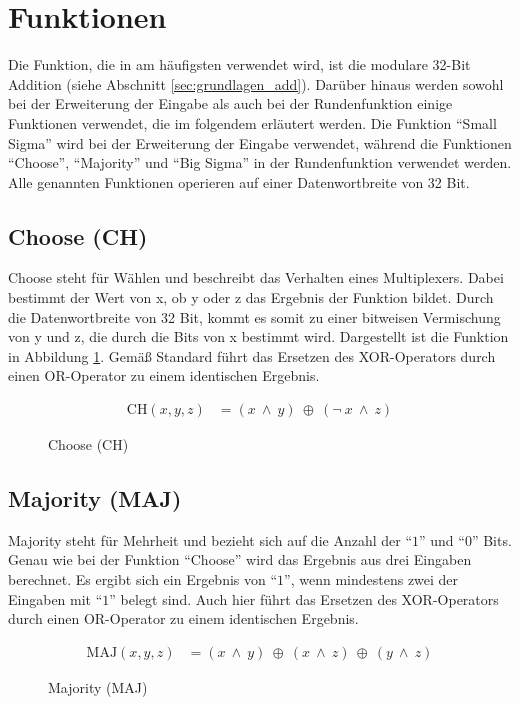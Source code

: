 \section{Funktionen}
\label{sec:sha256:funktionen}

Die Funktion, die in  am häufigsten verwendet wird, ist die modulare 32-Bit Addition (siehe Abschnitt \ref{sec:grundlagen_add}).
Darüber hinaus werden sowohl bei der Erweiterung der Eingabe als auch bei der Rundenfunktion einige Funktionen verwendet, die im folgendem erläutert werden.
Die Funktion "`Small Sigma"' wird bei der Erweiterung der Eingabe verwendet, während die Funktionen "`Choose"', "`Majority"' und "`Big Sigma"' in der Rundenfunktion
verwendet werden. Alle genannten Funktionen operieren auf einer Datenwortbreite von 32 Bit.


\subsection{Choose (CH)}
Choose steht für Wählen und beschreibt das Verhalten eines Multiplexers. Dabei bestimmt der Wert von x, ob y oder z das Ergebnis der Funktion bildet.
Durch die Datenwortbreite von 32 Bit, kommt es somit zu einer bitweisen Vermischung von y und z, die durch die Bits von x bestimmt wird. Dargestellt
ist die Funktion in Abbildung \ref{eq:ch}. Gemäß Standard \cite[10]{nist1804} führt das Ersetzen des XOR-Operators durch einen OR-Operator zu einem identischen Ergebnis.
\begin{figure}[!h]
  \begin{align}
  \text{CH}( x, y, z) &= (x~\wedge~y)~\oplus~( \neg~x~\wedge~z) \nonumber
  \end{align}
  \caption{Choose (CH)}
  \label{eq:ch}
\end{figure}

\subsection{Majority (MAJ)}
Majority steht für Mehrheit und bezieht sich auf die Anzahl der "`$1$"' und "`$0$"' Bits. Genau wie bei der Funktion "`Choose"' wird das Ergebnis aus drei Eingaben berechnet.
Es ergibt sich ein Ergebnis von "`$1$"', wenn mindestens zwei der Eingaben mit "`$1$"' belegt sind. Auch hier führt das Ersetzen des XOR-Operators durch einen OR-Operator zu
einem identischen Ergebnis.
\begin{figure}[!h]
  \begin{align}
  \text{MAJ}( x, y, z) &= (x~\wedge~y)~\oplus~(x~\wedge~z)~\oplus~(y~\wedge~z) \nonumber
  \end{align}
  \caption{Majority (MAJ)}
  \label{eq:maj}
\end{figure}


